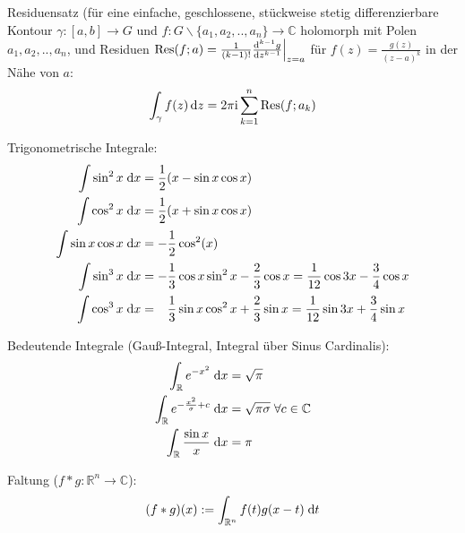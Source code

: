 			\noindent
			Residuensatz (für eine einfache, geschlossene, stückweise stetig differenzierbare Kontour $\gamma:\left[a,b\right]\rightarrow G$ und $f:G\backslash\lbrace a_1, a_2, .., a_n\rbrace \rightarrow \mathbb{C}$ holomorph mit Polen $a_1, a_2, .., a_n$, und Residuen $\mathrm{Res}(f; a) = \frac{1}{(k-1)!}\frac{\mathrm{d}^{k-1} g}{\mathrm{d} z^{k-1}}\Big|_{z=a}$ für $f(z)=\frac{g(z)}{(z-a)^k}$ in der Nähe von $a$:
			\begin{equation}
				\int_\gamma f(z)\,\mathrm{d} z = 2\pi \mathrm{i} \sum_{k=1}^{n} \mathrm{Res}(f; a_k)
			\end{equation}

			\noindent
			Trigonometrische Integrale:
			\begin{equation}
				\begin{split}
					\int \sin^2 x\;\mathrm{d} x &= \frac{1}{2}( x-\sin  x\cos  x) \\
					\int \cos^2 x\;\mathrm{d} x &= \frac{1}{2}( x+\sin  x\cos  x) \\
					\int{\sin x\cos x\; \mathrm{d} x} &= -\frac{1}{2}\cos^2( x) \\
					\int \sin^3 x\;\mathrm{d} x &= -\frac{1}{3}\cos{ x}\sin^2{ x}-\frac{2}{3}\cos{ x}
					= \frac{1}{12}\cos{3 x}-\frac{3}{4}\cos{ x} \\
					\int \cos^3 x\;\mathrm{d} x &= \phantom{-}\frac{1}{3}\sin x \cos^2 x+\frac{2}{3}\sin  x
					= \frac{1}{12}\sin{3 x}+\frac{3}{4}\sin{ x} \\
				\end{split}
			\end{equation}

			\noindent
			Bedeutende Integrale (Gauß-Integral, Integral über Sinus Cardinalis):
			\begin{equation}
				\begin{aligned}
					\int_\mathbb{R} e^{-x^2}\;\mathrm{d} x &= \sqrt{\pi} \\
					\int_\mathbb{R} e^{-\frac{x^2}{\sigma}+c}\;\mathrm{d} x &= \sqrt{\pi\sigma} \;\forall c\in\mathbb{C} \\
					\int_\mathbb{R} \frac{\sin x}{x}\;\mathrm{d} x &= \pi \\
				\end{aligned}
			\end{equation}

			\noindent
			Faltung ($f*g:\mathbb{R}^n \rightarrow \mathbb{C}$):
			\begin{equation}
				(f*g)(x) := \int_{\mathbb{R}^n} f(t) g(x-t)\;\mathrm{d} t
			\end{equation}

